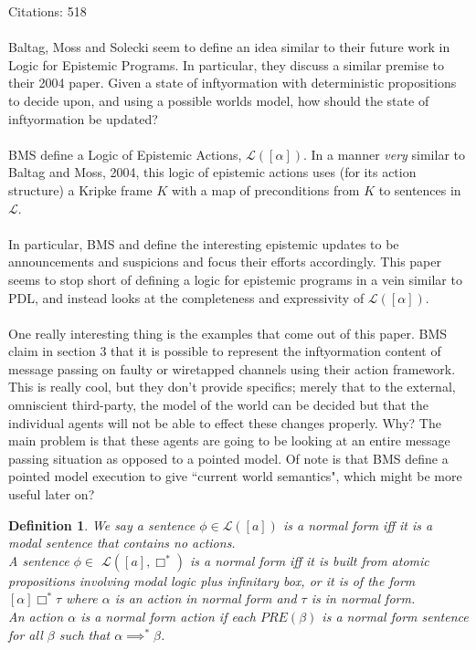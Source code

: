 \documentclass[10pt, a4paper, twoside]{article}
\newcommand{\modalLog}{$\mathcal{L}$}
\newtheorem{defn}{Definition}
\begin{document}
Citations: 518\\
\\
Baltag, Moss and Solecki seem to define an idea similar to their future work in
Logic for Epistemic Programs.
In particular, they discuss a similar premise to their 2004 paper.
Given a state of inftyormation with deterministic propositions to decide upon, and
using a possible worlds model, how should the state of inftyormation be updated?\\
\\
BMS define a Logic of Epistemic Actions, \modalLog$([\alpha])$.
In a manner {\em very} similar to Baltag and Moss, 2004, this logic of epistemic
actions uses (for its action structure) a Kripke frame $K$ with a map of
preconditions from $K$ to sentences in \modalLog.\\
\\
In particular, BMS and define the interesting epistemic updates to be
announcements and suspicions and focus their efforts accordingly.
This paper seems to stop short of defining a logic for epistemic programs in a
vein similar to PDL, and instead looks at the completeness and expressivity of
\modalLog$([\alpha])$.\\
\\
One really interesting thing is the examples that come out of this paper.
BMS claim in section 3 that it is possible to represent the inftyormation content
of message passing on faulty or wiretapped channels using their action
framework.
This is really cool, but they don't provide specifics; merely that to the
external, omniscient third-party, the model of the world can be decided but that
the individual agents will not be able to effect these changes properly.
Why?
The main problem is that these agents are going to be looking at an entire
message passing situation as opposed to a pointed model.
Of note is that BMS define a pointed model execution to give ``current world
semantics", which might be more useful later on?
\begin{defn}
We say a sentence $\phi \in $\modalLog$([a])$ is a normal form iff it is a
modal sentence that contains no actions.\\
A sentence $\phi \in$ \modalLog$([a],\Box^{\ast})$ is a normal form iff it is built
from atomic propositions involving modal logic plus infinitary box, or it is of
the form $[\alpha]\Box^{\ast}\tau$ where $\alpha$ is an action in normal form and
$\tau$ is in normal form.\\
An action $\alpha$ is a normal form action if each $PRE(\beta)$ is a normal form
sentence for all $\beta$ such that $\alpha \implies^{\ast} \beta$.
\end{defn}
\end{document}
